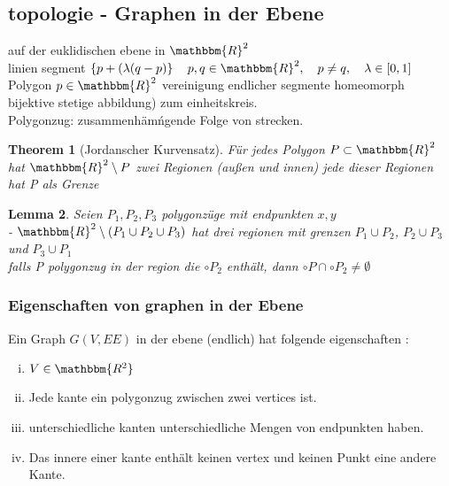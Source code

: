 \documentclass[a4paper]{article}
\newtheorem{theorem}{Theorem}[section]
\newtheorem{lemma}[theorem]{Lemma}
\theoremstyle{definition}
\theoremstyle{remark}
\begin{document}
\subsection{topologie - Graphen in der Ebene}
\label{sub:topologie_graphen_in_der_ebene}

 auf der euklidischen ebene in $ \mathbbm{R}^2$\\
linien segment $\left\{ p+(\lambda (q-p) \right\}\quad p,q\in \mathbbm{R}^2, \quad p\neq q, \quad \lambda \in \left[ 0,1 \right]$\\
Polygon $p\in \mathbbm{R}^2 $ vereinigung endlicher segmente homeomorph bijektive stetige abbildung) zum einheitskreis.\\
Polygonzug: zusammenhämńgende Folge von strecken.
\begin{theorem}
  [Jordanscher Kurvensatz]	
  Für jedes Polygon $P \subset \mathbbm{R}^2$ hat $\mathbbm{R}^2 \setminus P$ zwei Regionen (außen und innen) jede dieser Regionen hat P als Grenze 
\end{theorem}
\begin{lemma}
  Seien $P_1,P_2,P_3$ polygonzüge mit endpunkten $x,y$ \\
  - $ \mathbbm{R}^2\setminus (P_1\cup P_2\cup P_3) $ hat drei regionen mit grenzen $P_1\cup P_2$, $P_2 \cup P_3$ und $P_3 \cup P_1$ \\
  falls P polygonzug in der region die $\circ{P}_2$ enthält, dann $\circ{P}\cap \circ{P}_2 \neq \emptyset$ 

\end{lemma}
\subsubsection{Eigenschaften von graphen in der Ebene}
\label{ssub:eigenschaften_von_graphen_in_der_ebene}

Ein Graph $G(V,EE)$ in der ebene (endlich) hat folgende eigenschaften :

\begin{enumerate}[(i)]
  \item $V\in \mathbbm{R^2}$
   \item Jede kante ein polygonzug zwischen zwei vertices ist.
   \item unterschiedliche kanten unterschiedliche Mengen von endpunkten haben. 
   \item Das innere einer kante enthält keinen vertex und keinen Punkt eine andere Kante.
\end{enumerate}
\end{document}
